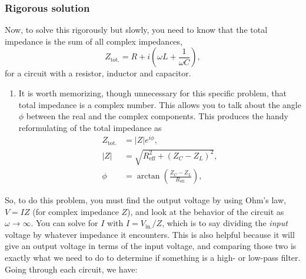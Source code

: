 \documentclass[11pt]{paper}
\begin{document}
\subsubsection*{Rigorous solution}
Now, to solve this rigorously but slowly, you need to know that the total impedance is the sum of all complex impedances,
\begin{equation}
Z_\text{tot.} = R + i\left(\omega L + \frac{1}{\omega C}\right),
\end{equation}
for a circuit with a resistor, inductor and capacitor.  
\begin{enumerate}[label=*]
\item It is worth memorizing, though unnecessary for this specific problem, that total impedance is a complex number.  This allows you to talk about the angle $\phi$ between the real and the complex components.  This produces the handy reformulating of the total impedance as
\begin{align}
Z_\text{tot.} &= \left|Z\right|e^{i\phi},\\
\left|Z\right|&=\sqrt{R_\text{eff}^2 + \left(Z_C - Z_L\right)^2},\\
\phi &= \arctan \left( \frac{Z_C - Z_L}{R_\text{eff.}}\right),
\end{align}

\end{enumerate}
So, to do this problem, you must find the output voltage by using Ohm's law, $V = IZ$ (for complex impedance $Z$), and look at the behavior of the circuit as $\omega \rightarrow \infty$.  You can solve for $I$ with $I = V_\text{in.}/Z$, which is to say dividing the \emph{input} voltage by whatever impedance it encounters.  This is also helpful because it will give an output voltage in terms of the input voltage, and comparing those two is exactly what we need to do to determine if something is a high- or low-pass filter.  Going through each circuit, we have:
\end{document}
